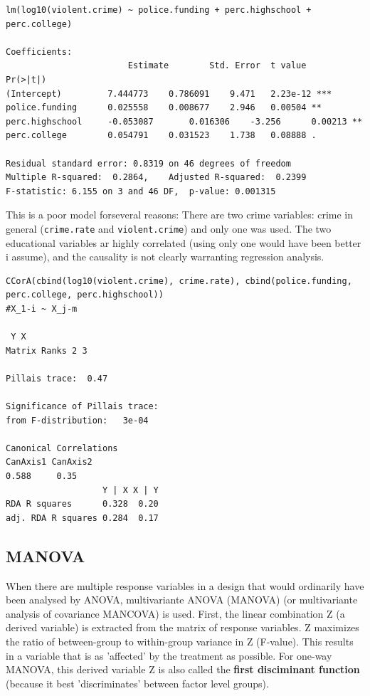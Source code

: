 \documentclass{article}
\begin{document}
\begin{lstlisting}
lm(log10(violent.crime) ~ police.funding + perc.highschool + perc.college)

Coefficients:
                 		Estimate 		Std. Error 	t value 	Pr(>|t|)    
(Intercept)      	7.444773   	0.786091   	9.471 	2.23e-12 ***
police.funding   	0.025558   	0.008677   	2.946  	0.00504 ** 
perc.highschool 	-0.053087   	0.016306  	-3.256  	0.00213 ** 
perc.college     	0.054791   	0.031523   	1.738  	0.08888 .  

Residual standard error: 0.8319 on 46 degrees of freedom
Multiple R-squared:  0.2864,    Adjusted R-squared:  0.2399 
F-statistic: 6.155 on 3 and 46 DF,  p-value: 0.001315
\end{lstlisting}
This is a poor model forseveral reasons: There are two crime variables: crime in general (\texttt{crime.rate} and \texttt{violent.crime}) and only one was used. The two educational variables ar highly correlated (using only one would have been better i assume), and the causality is not clearly warranting regression analysis.

\begin{lstlisting}
CCorA(cbind(log10(violent.crime), crime.rate), cbind(police.funding, perc.college, perc.highschool)) 
#X_1-i ~ X_j-m

 Y X
Matrix Ranks 2 3

Pillais trace:  0.47 

Significance of Pillais trace:
from F-distribution:   3e-04 
                       
Canonical Correlations    
CanAxis1 CanAxis2
0.588     0.35
                   Y | X X | Y
RDA R squares      0.328  0.20
adj. RDA R squares 0.284  0.17
\end{lstlisting}

\subsection{MANOVA}
When there are multiple response variables in a design that would ordinarily have been analysed by ANOVA, multivariante ANOVA (MANOVA) (or multivariante analysis of covariance MANCOVA) is used. First, the linear combination Z (a derived variable) is extracted from the matrix of response variables. Z maximizes the ratio of between-group to within-group variance in Z (F-value). This results in a variable that is as 'affected' by the treatment as possible. For one-way MANOVA, this derived variable Z is also called the \textbf{first disciminant function} (because it best 'discriminates' between factor level groups).
\end{document}
